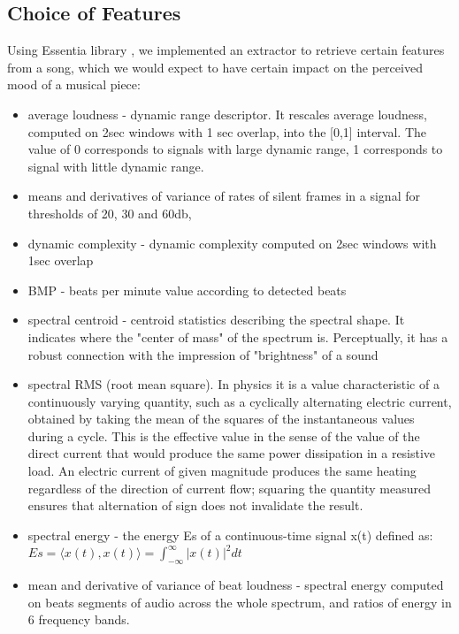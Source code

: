 \subsection{Choice of Features}
Using Essentia library \cite{essentia}, we implemented an extractor to retrieve certain features from a song, which we would expect to have certain impact on the perceived mood of a musical piece:
\begin{itemize}

\item average loudness - dynamic range descriptor. It rescales average loudness, computed on 2sec windows with 1 sec overlap, into the [0,1] interval. The value of 0 corresponds to signals with large dynamic range, 1 corresponds to signal with little dynamic range. 

\item means and derivatives of variance of rates of silent frames in a signal for thresholds of 20, 30 and 60db,

\item dynamic complexity - dynamic complexity computed on 2sec windows with 1sec overlap

\item BMP - beats per minute value according to detected beats

\item spectral centroid - centroid statistics describing the spectral shape. It indicates where the "center of mass" of the spectrum is. Perceptually, it has a robust connection with the impression of "brightness" of a sound

\item spectral RMS (root mean square). In physics it is a value characteristic of a continuously varying quantity, such as a cyclically alternating electric current, obtained by taking the mean of the squares of the instantaneous values during a cycle. This is the effective value in the sense of the value of the direct current that would produce the same power dissipation in a resistive load. An electric current of given magnitude produces the same heating regardless of the direction of current flow; squaring the quantity measured ensures that alternation of sign does not invalidate the result.
\item spectral energy - the energy E{s} of a continuous-time signal x(t) defined as: \\
$ E{s}  =  \langle x(t), x(t)\rangle =  \int_{-\infty}^{\infty}{|x(t)|^2}dt $

\item mean and derivative of variance of beat loudness -  spectral energy computed on beats segments of audio across the whole spectrum, and ratios of energy in 6 frequency bands.


\end{itemize}
